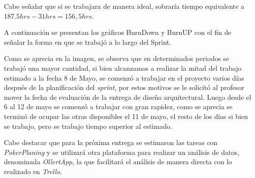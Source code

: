 \documentclass{memoria}
\begin{document}
Cabe señalar que si se trabajara de manera ideal, sobraría  tiempo equivalente a $187.5hrs - 31hrs = 156,5hrs$. 

A continuación se presentan los gráficos BurnDown y BurnUP con el fin de señalar la forma en que se trabajó a lo largo del Sprint.


\newpage
{}

Como se aprecia en la imagen, se observa que en determinados periodos se trabajó una mayor cantidad, si bien alcanzamos a realizar la mitad del trabajo estimado a la fecha 8 de Mayo, se comenzó a trabajar en el proyecto varios días después de la planificación del \textsl{sprint}, por estos motivos se le solicitó al profesor mover la fecha de evaluación de la entrega de diseño arquitectural. Luego desde el 6 al 12 de mayo se comenzó a trabajar con gran rapidez, como se aprecia se terminó de ocupar las otras disponibles el 11 de mayo, el resto de los días si bien se trabajo, pero se trabajo tiempo superior al estimado.

Cabe destacar que para la próxima entrega se estimaron las tareas con \textsl{PokerPlaning} y se utilizará otra plataforma para realizar un análisis de datos, denominada \textsl{OllertApp}, la que facilitará el análisis de manera directa con lo realizado en \textsl{Trello}.
\end{document}
